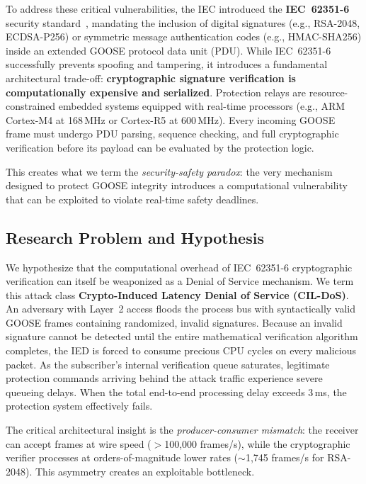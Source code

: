 \documentclass[journal]{IEEEtran}
\begin{document}
To address these critical vulnerabilities, the IEC introduced the \textbf{IEC~62351-6} security standard~\cite{iec62351}, mandating the inclusion of digital signatures (e.g., RSA-2048, ECDSA-P256) or symmetric message authentication codes (e.g., HMAC-SHA256) inside an extended GOOSE protocol data unit (PDU). While IEC~62351-6 successfully prevents spoofing and tampering, it introduces a fundamental architectural trade-off: \textbf{cryptographic signature verification is computationally expensive and serialized}. Protection relays are resource-constrained embedded systems equipped with real-time processors (e.g., ARM Cortex-M4 at 168\,MHz or Cortex-R5 at 600\,MHz). Every incoming GOOSE frame must undergo PDU parsing, sequence checking, and full cryptographic verification before its payload can be evaluated by the protection logic.

This creates what we term the \emph{security-safety paradox}: the very mechanism designed to protect GOOSE integrity introduces a computational vulnerability that can be exploited to violate real-time safety deadlines.

\subsection{Research Problem and Hypothesis}
We hypothesize that the computational overhead of IEC~62351-6 cryptographic verification can itself be weaponized as a Denial of Service mechanism. We term this attack class \textbf{Crypto-Induced Latency Denial of Service (CIL-DoS)}. An adversary with Layer~2 access floods the process bus with syntactically valid GOOSE frames containing randomized, invalid signatures. Because an invalid signature cannot be detected until the entire mathematical verification algorithm completes, the IED is forced to consume precious CPU cycles on every malicious packet. As the subscriber's internal verification queue saturates, legitimate protection commands arriving behind the attack traffic experience severe queueing delays. When the total end-to-end processing delay exceeds 3\,ms, the protection system effectively fails.

The critical architectural insight is the \emph{producer-consumer mismatch}: the receiver can accept frames at wire speed ($>$100,000 frames/s), while the cryptographic verifier processes at orders-of-magnitude lower rates ($\sim$1,745 frames/s for RSA-2048). This asymmetry creates an exploitable bottleneck.
\end{document}
